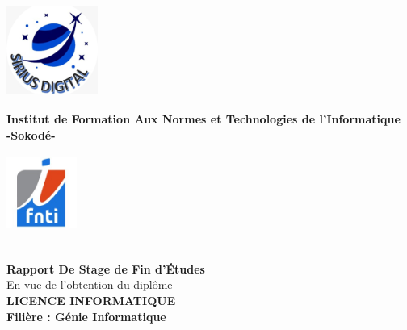 
\begin{titlepage}
	\begin{center}
		\begin{minipage}{1.5cm}
			\begin{center}
				\includegraphics[width=3cm,height=3cm]{images/logo/logo-arcop.png}

			\end{center}
		\end{minipage}\hfill
		\begin{minipage}{12cm}
			\begin{center}
				\textbf{ Institut de Formation Aux Normes et Technologies de l'Informatique}\\[0.1cm]
				\textbf{-Sokodé-}

			\end{center}
		\end{minipage}\hfill
		\begin{minipage}{1.5cm}
			\begin{center}
				\includegraphics[width=2.3cm,height=2.5cm]{images/logo/logo-ifnti.png}
			\end{center}

		\end{minipage}
	
		\textsc{\Large }\\[1cm]
		{\large \bfseries Rapport De Stage de Fin d'\uppercase{é}tudes}\\[0.5cm]
		{\large En vue de l'obtention du diplôme}\\[0.5cm]

		{\huge \bfseries \uppercase{Licence Informatique} \\[0.5cm] }
		{\large \bfseries Filière : Génie Informatique}
		\textsc{\Large }\\[1cm]


\end{center}
\end{titlepage}
